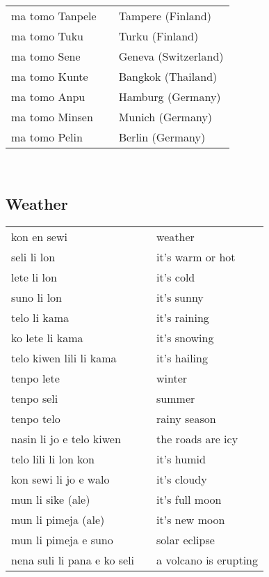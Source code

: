 \begin{supertabular}{p{4,5cm}|ll}
    ma tomo Tanpele                   &  & Tampere (Finland)         \\
    ma tomo Tuku                      &  & Turku (Finland)           \\
    ma tomo Sene                      &  & Geneva (Switzerland)      \\
    ma tomo Kunte                     &  & Bangkok (Thailand)        \\
    ma tomo Anpu                      &  & Hamburg (Germany)         \\
    ma tomo Minsen                    &  & Munich (Germany)          \\
    ma tomo Pelin                     &  & Berlin (Germany)          \\
\end{supertabular} \\
%
%
%
\subsection{Weather}
%
\begin{supertabular}{p{4,5cm}|ll}
    kon en sewi                 &  & weather               \\

    seli li lon                 &  & it's warm or hot      \\
    lete li lon                 &  & it's cold             \\
    suno li lon                 &  & it's sunny            \\
    telo li kama                &  & it's raining          \\
    ko lete li kama             &  & it's snowing          \\
    telo kiwen lili li kama     &  & it's hailing          \\
    tenpo lete                  &  & winter                \\
    tenpo seli                  &  & summer                \\
    tenpo telo                  &  & rainy season          \\
    nasin li jo e telo kiwen    &  & the roads are icy     \\
    telo lili li lon kon        &  & it's humid            \\
    kon sewi li jo e walo       &  & it's cloudy           \\
    mun li sike (ale)           &  & it's full moon        \\
    mun li pimeja (ale)         &  & it's new moon         \\
    mun li pimeja e suno        &  & solar eclipse         \\
    nena suli li pana e ko seli &  & a volcano is erupting \\
\end{supertabular} \\
%
%
%
